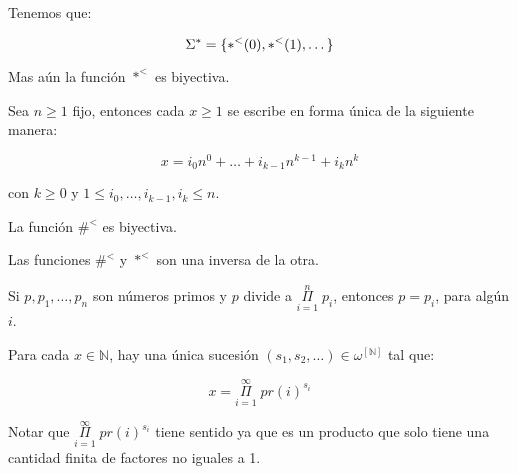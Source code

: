   \begin{lemma}
    \PN Tenemos que:

    \[
      \Sigma^{\ast} = \{\ast^{<}(0), \ast^{<}(1), \dotsc\}
    \]

    \PN Mas aún la función $\ast^{<}$ es biyectiva.
  \end{lemma}

  \begin{lemma}
    \PN Sea $n \geq 1$ fijo, entonces cada $x \geq 1$ se escribe en forma única de la siguiente manera:

    \[
      x = i_{0} n^{0} + \dotsc + i_{k-1} n^{k-1} + i_{k} n^{k}
    \]

    \PN con $k\geq 0$ y $1 \leq i_{0}, \dotsc, i_{k-1}, i_{k} \leq n$.
  \end{lemma}

  \begin{lemma}
    \PN La función $\#^{<}$ es biyectiva.
  \end{lemma}

  \begin{lemma}
    \PN Las funciones $\#^{<}$ y $\ast^{<}$ son una inversa de la otra.
  \end{lemma}

  \begin{lemma}
    \PN Si $p, p_{1}, \dotsc, p_{n}$ son números primos y $p$ divide a $\underset{i=1}{\overset{n}{\Pi}} \; p_{i}$,
    entonces $p = p_{i}$, para algún $i$.
  \end{lemma}

  \begin{theorem}
    \PN Para cada $x \in \mathbb{N}$, hay una única sucesión $(s_{1}, s_{2}, \dotsc) \in
    \omega^{\left[\mathbb{N}\right]}$ tal que:

    \[
      x = \underset{i=1}{\overset{\infty}{\Pi}} \; pr(i)^{s_{i}}
    \]

    \PN Notar que $\underset{i=1}{\overset{\infty}{\Pi}} \; pr(i)^{s_{i}}$ tiene sentido ya que es un producto que solo
    tiene una cantidad finita de factores no iguales a 1.
  \end{theorem}

